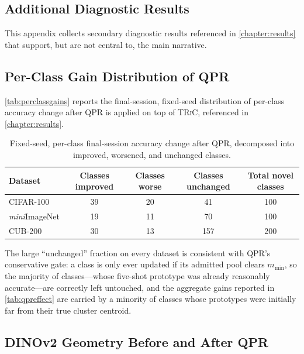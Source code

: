\documentclass{iutbscthesis}
\begin{document}

\printbib

\begin{appendices}

\chapter{Additional Diagnostic Results}
\label{appendix:diagnostics}

This appendix collects secondary diagnostic results referenced in \autoref{chapter:results} that support, but are not central to, the main narrative.

\section{Per-Class Gain Distribution of QPR}

\autoref{tab:perclassgains} reports the final-session, fixed-seed distribution of per-class accuracy change after QPR is applied on top of \textsc{TRiC}, referenced in \autoref{chapter:results}.

\begin{table}[H]
    \centering
    \begin{tabular}{l c c c c}
        \toprule
        Dataset & Classes improved & Classes worse & Classes unchanged & Total novel classes \\
        \midrule
        CIFAR-100 & 39 & 20 & 41 & 100 \\
        \emph{mini}ImageNet & 19 & 11 & 70 & 100 \\
        CUB-200 & 30 & 13 & 157 & 200 \\
        \bottomrule
    \end{tabular}
    \caption{Fixed-seed, per-class final-session accuracy change after QPR, decomposed into improved, worsened, and unchanged classes.}
    \label{tab:perclassgains}
\end{table}

The large ``unchanged'' fraction on every dataset is consistent with QPR's conservative gate: a class is only ever updated if its admitted pool clears $m_{\min}$, so the majority of classes---whose five-shot prototype was already reasonably accurate---are correctly left untouched, and the aggregate gains reported in \autoref{tab:qpreffect} are carried by a minority of classes whose prototypes were initially far from their true cluster centroid.

\section{DINOv2 Geometry Before and After QPR}


\end{appendices}
\end{document}

